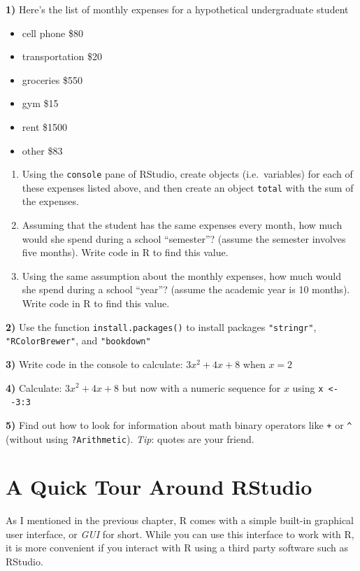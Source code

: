\documentclass[
]{book}
\providecommand{\tightlist}{%
  \setlength{\itemsep}{0pt}\setlength{\parskip}{0pt}}
\begin{document}
\textbf{1)} Here's the list of monthly expenses for a hypothetical undergraduate
student

\begin{itemize}
\tightlist
\item
  cell phone \$80
\item
  transportation \$20
\item
  groceries \$550
\item
  gym \$15
\item
  rent \$1500
\item
  other \$83
\end{itemize}

\begin{enumerate}
\def\labelenumi{\alph{enumi})}
\item
  Using the \texttt{console} pane of RStudio, create objects (i.e.~variables) for each
  of these expenses listed above, and then create an object \texttt{total} with the sum
  of the expenses.
\item
  Assuming that the student has the same expenses every month, how much would
  she spend during a school ``semester''? (assume the semester involves five months).
  Write code in R to find this value.
\item
  Using the same assumption about the monthly expenses, how much would
  she spend during a school ``year''? (assume the academic year is 10 months).
  Write code in R to find this value.
\end{enumerate}

\textbf{2)} Use the function \texttt{install.packages()} to install packages \texttt{"stringr"},
\texttt{"RColorBrewer"}, and \texttt{"bookdown"}

\textbf{3)} Write code in the console to calculate: \(3x^2 + 4x + 8\) when \(x = 2\)

\textbf{4)} Calculate: \(3x^2 + 4x + 8\) but now with a numeric sequence for \(x\)
using \texttt{x\ \textless{}-\ -3:3}

\textbf{5)} Find out how to look for information about math binary operators
like \texttt{+} or \texttt{\^{}} (without using \texttt{?Arithmetic}). \emph{Tip}: quotes are your friend.

\hypertarget{rstudio}{%
\chapter{A Quick Tour Around RStudio}\label{rstudio}}

As I mentioned in the previous chapter, R comes with a simple built-in graphical
user interface, or \emph{GUI} for short. While you can use this interface to
work with R, it is more convenient if you interact with R using a third party
software such as RStudio.
\end{document}
